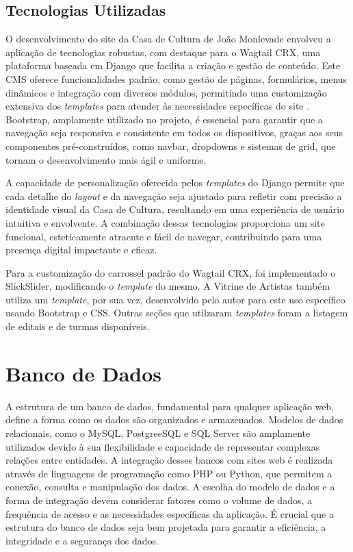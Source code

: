 \subsection{Tecnologias Utilizadas}

O desenvolvimento do site da Casa de Cultura de João Monlevade envolveu a aplicação de tecnologias robustas, com destaque para o Wagtail CRX, uma plataforma baseada em Django que facilita a criação e gestão de conteúdo. Este \ac{CMS} oferece funcionalidades padrão, como gestão de páginas, formulários, menus dinâmicos e integração com diversos módulos, permitindo uma customização extensiva dos \textit{templates} para atender às necessidades específicas do site \cite{ellis2015coders}. Bootstrap, amplamente utilizado no projeto, é essencial para garantir que a navegação seja responsiva e consistente em todos os dispositivos, graças aos seus componentes pré-construídos, como navbar, dropdowns e sistemas de grid, que tornam o desenvolvimento mais ágil e uniforme. 

A capacidade de personalização oferecida pelos \textit{templates} do Django permite que cada detalhe do \textit{layout} e da navegação seja ajustado para refletir com precisão a identidade visual da Casa de Cultura, resultando em uma experiência de usuário intuitiva e envolvente. A combinação dessas tecnologias proporciona um site funcional, esteticamente atraente e fácil de navegar, contribuindo para uma presença digital impactante e eficaz.

Para a customização do carrossel padrão do Wagtail CRX, foi implementado o SlickSlider, modificando o \textit{template} do mesmo. A Vitrine de Artistas também utiliza um \textit{template}, por sua vez, desenvolvido pelo autor para este uso específico usando Bootstrap e \ac{CSS}. Outras seções que utilzaram \textit{templates} foram a listagem de editais e de turmas disponíveis.

\section{Banco de Dados}

A estrutura de um banco de dados, fundamental para qualquer aplicação web, define a forma como os dados são organizados e armazenados. Modelos de dados relacionais, como o MySQL, PostgreeSQL e SQL Server são amplamente utilizados devido à sua flexibilidade e capacidade de representar complexas relações entre entidades. A integração desses bancos com sites web é realizada através de linguagens de programação como PHP ou Python, que permitem a conexão, consulta e manipulação dos dados. A escolha do modelo de dados e a forma de integração devem considerar fatores como o volume de dados, a frequência de acesso e as necessidades específicas da aplicação. É crucial que a estrutura do banco de dados seja bem projetada para garantir a eficiência, a integridade e a segurança dos dados.

